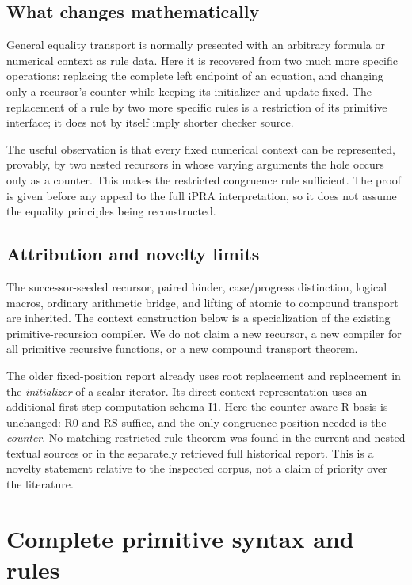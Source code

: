 \documentclass[11pt,letterpaper]{article}
\theoremstyle{definition}\newtheorem{definition}[theorem]{Definition}
\theoremstyle{remark}\newtheorem{remark}[theorem]{Remark}
\begin{document}
\subsection{What changes mathematically}

General equality transport is normally presented with an arbitrary
formula or numerical context as rule data. Here it is recovered from two
much more specific operations: replacing the complete left endpoint of
an equation, and changing only a recursor's counter while keeping its
initializer and update fixed. The replacement of a rule by two more
specific rules is a restriction of its primitive interface; it does not
by itself imply shorter checker source.

The useful observation is that every fixed numerical context can be
represented, provably, by two nested recursors in whose varying arguments
the hole occurs only as a counter. This makes the restricted congruence
rule sufficient. The proof is given before any appeal to the full iPRA
interpretation, so it does not assume the equality principles being
reconstructed.

\subsection{Attribution and novelty limits}

The successor-seeded recursor, paired binder, case/progress distinction,
logical macros, ordinary arithmetic bridge, and lifting of atomic to
compound transport are inherited\cite{atomic,successor,fixedposition}.
The context construction below is a specialization of the existing
primitive-recursion compiler. We do not claim a new recursor, a new
compiler for all primitive recursive functions, or a new compound
transport theorem.

The older fixed-position report already uses root replacement and
replacement in the \emph{initializer} of a scalar iterator. Its direct
context representation uses an additional first-step computation schema
I1. Here the counter-aware R basis is unchanged: R0 and RS suffice, and
the only congruence position needed is the \emph{counter}. No matching
restricted-rule theorem was found in the current and nested textual
sources or in the separately retrieved full historical report. This is
a novelty statement relative to the inspected corpus, not a claim of
priority over the literature.

\section{Complete primitive syntax and rules}
\label{sec:theory}
\end{document}

